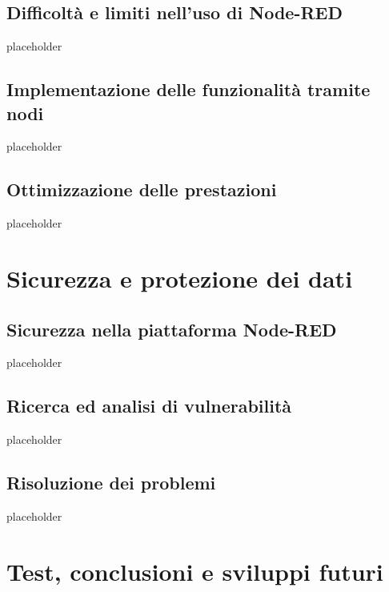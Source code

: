 \documentclass[a4paper,10pt]{memoir}
\begin{document}
\section{Difficoltà e limiti nell'uso di Node-RED}

placeholder

\clearpage

\section{Implementazione delle funzionalità tramite nodi}

placeholder

\clearpage

\section{Ottimizzazione delle prestazioni}

placeholder

\clearpage

\chapter{Sicurezza e protezione dei dati}

\section{Sicurezza nella piattaforma Node-RED}

placeholder

\clearpage

\section{Ricerca ed analisi di vulnerabilità}

placeholder

\clearpage

\section{Risoluzione dei problemi}

placeholder

\clearpage


\chapter{Test, conclusioni e sviluppi futuri}
\end{document}
